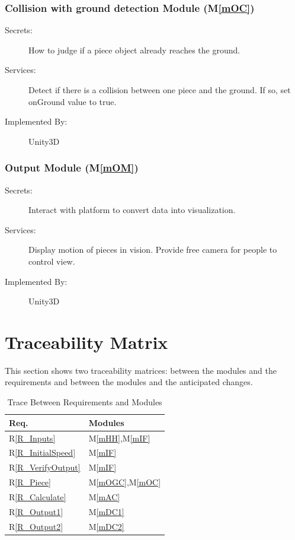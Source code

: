 \documentclass[12pt, titlepage]{article}
\newcommand{\rref}[1]{R\ref{#1}}
\newcommand{\mref}[1]{M\ref{#1}}
\begin{document}
	\subsubsection{Collision with ground detection Module (\mref{mOC})}
	
	\begin{description}
		\item[Secrets:] How to judge if a piece object already reaches the ground.
		\item[Services:] Detect if there is a collision between one piece and the ground. If so, set onGround value to true. 
		\item[Implemented By:] Unity3D
	\end{description}
	
	\subsubsection{Output Module (\mref{mOM})}
	
	\begin{description}
		\item[Secrets:] Interact with platform to convert data into visualization.
		\item[Services:] Display motion of pieces in vision. Provide free camera for people to control view.
		\item[Implemented By:] Unity3D
		\end{description}
	
	\section{Traceability Matrix} \label{SecTM}
	
	This section shows two traceability matrices: between the modules and the
	requirements and between the modules and the anticipated changes.
	
	\begin{table}[H]
		\centering
		\begin{tabular}{p{} p{}}
			\toprule
			\textbf{Req.} & \textbf{Modules}\\
			\midrule
			\rref{R_Inputs} & \mref{mHH},\mref{mIF}\\
			\rref{R_InitialSpeed} & \mref{mIF}\\
			\rref{R_VerifyOutput} & \mref{mIF}\\
			\rref{R_Piece} & \mref{mOGC},\mref{mOC}\\
			\rref{R_Calculate} & \mref{mAC}\\
			\rref{R_Output1} & \mref{mDC1}\\
			\rref{R_Output2} & \mref{mDC2}\\
			\bottomrule
		\end{tabular}
		\caption{Trace Between Requirements and Modules}
		\label{TblRT}
	\end{table}
	
\end{document}
